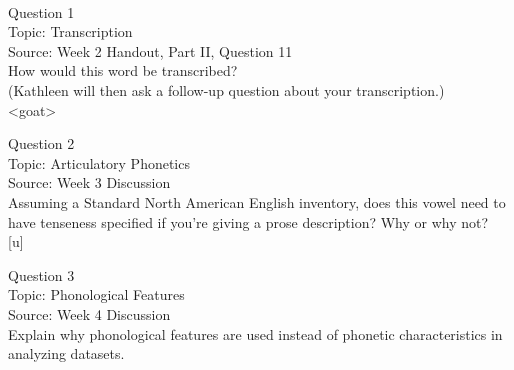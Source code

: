 \documentclass[12pt]{article}
\begin{document}
\newpage

\begin{center}
\textbf{{\color{red}{\HUGE END OF EXAM}}}\\

\end{center}
\newpage

\begin{center}
\textbf{{\color{blue}{\HUGE START OF EXAM\\}}}

\textbf{{\color{blue}{\HUGE Student ID: 28926\\}}}

\textbf{{\color{blue}{\HUGE \\}}}

\end{center}
\newpage

{\large Question 1}\\

Topic: Transcription\\
Source: Week 2 Handout, Part II, Question 11\\

How would this word be transcribed?\\ (Kathleen will then ask a follow-up question about your transcription.)\\

<goat>


\newpage

{\large Question 2}\\

Topic: Articulatory Phonetics\\
Source: Week 3 Discussion\\

Assuming a Standard North American English inventory, does this vowel need to have tenseness specified if you're giving a prose description? Why or why not?\\

{[u]}


\newpage

{\large Question 3}\\

Topic: Phonological Features\\
Source: Week 4 Discussion\\

Explain why phonological features are used instead of phonetic characteristics in analyzing datasets.\\


\newpage
\end{document}
